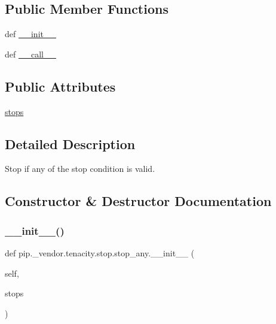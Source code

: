 \subsection*{Public Member Functions}
\begin{DoxyCompactItemize}
\item 
def \hyperlink{classpip_1_1__vendor_1_1tenacity_1_1stop_1_1stop__any_aac9a1c0b4ac7593d5512513d581c994c}{\+\_\+\+\_\+init\+\_\+\+\_\+}
\item 
def \hyperlink{classpip_1_1__vendor_1_1tenacity_1_1stop_1_1stop__any_a3cadbbb69de9607282ecce852d1c1a5a}{\+\_\+\+\_\+call\+\_\+\+\_\+}
\end{DoxyCompactItemize}
\subsection*{Public Attributes}
\begin{DoxyCompactItemize}
\item 
\hyperlink{classpip_1_1__vendor_1_1tenacity_1_1stop_1_1stop__any_a8f090f0ae80b2a6eaac3e8c1e6799be0}{stops}
\end{DoxyCompactItemize}


\subsection{Detailed Description}
\begin{DoxyVerb}Stop if any of the stop condition is valid.\end{DoxyVerb}
 

\subsection{Constructor \& Destructor Documentation}
\mbox{\label{classpip_1_1__vendor_1_1tenacity_1_1stop_1_1stop__any_aac9a1c0b4ac7593d5512513d581c994c}} 
\subsubsection{\texorpdfstring{\+\_\+\+\_\+init\+\_\+\+\_\+()}{\_\_init\_\_()}}
{\footnotesize\ttfamily def pip.\+\_\+vendor.\+tenacity.\+stop.\+stop\+\_\+any.\+\_\+\+\_\+init\+\_\+\+\_\+ (\begin{DoxyParamCaption}\item[{}]{self,  }\item[{}]{stops }\end{DoxyParamCaption})}



